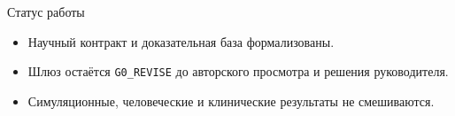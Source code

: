 \begin{frame}\titlepage\end{frame}
\begin{frame}{Статус работы}
\begin{itemize}
  \item Научный контракт и доказательная база формализованы.
  \item Шлюз остаётся \texttt{G0\_REVISE} до авторского просмотра и решения руководителя.
  \item Симуляционные, человеческие и клинические результаты не смешиваются.
\end{itemize}
\end{frame}
